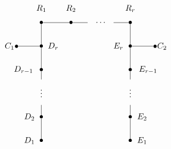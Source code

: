 \[
\xygraph{
  !{<0cm,0cm>;<1.25cm,0cm>:<0cm,1cm>::}
  !{(1,5) }*{\bullet}="r1"
  !{(2,5) }*{\bullet}="r2"
  !{(3,5) }*{\quad\cdots\quad}="rspace"
  !{(4,5) }*{\bullet}="rrm"
  !{(1,5.6) }*{R_1}
  !{(2,5.6) }*{R_2}
  !{(4,5.6) }*{R_r}
  !{(0,4) }*{C_1\bullet}="c1"
  !{(5,4) }*{\bullet C_2}="c2"
  !{(1,0) }*{\bullet}="d1"
  !{(1,1) }*{\bullet}="d2"
  !{(1,1.5) }*{}="dbelow"
  !{(1,2.1) }*{\vdots}="dspace"
  !{(1,2.6) }*{}="dabove"
  !{(1,3) }*{\bullet}="drm"
  !{(1,4) }*{\bullet}="dr"
  !{(.6,0) }*{D_1}
  !{(.6,1) }*{D_2}
  !{(.4,3) }*{D_{r-1}}
  !{(1.4,4) }*{D_r}
  !{(4,0) }*{\bullet}="e1"
  !{(4,1) }*{\bullet}="e2"
  !{(4,1.5) }*{}="ebelow"
  !{(4,2.1) }*{\vdots}="espace"
  !{(4,2.6) }*{}="eabove"
  !{(4,3) }*{\bullet}="erm"
  !{(4,4) }*{\bullet}="er"
  !{(4.4,0) }*{E_1}
  !{(4.4,1) }*{E_2}
  !{(4.6,3) }*{E_{r-1}}
  !{(3.6,4) }*{E_r}
  "r1"-"r2"
  "r2"-"rspace"
  "rspace"-"rrm"
  "r1"-"dr"
  "c1"-"dr"
  "dr"-"drm"
  "drm"-"dabove"
  "dbelow"-"d2"
  "d2"-"d1"
  "rrm"-"er"
  "c2"-"er"
  "er"-"erm"
  "erm"-"eabove"
  "ebelow"-"e2"
  "e2"-"e1"
}
\]



